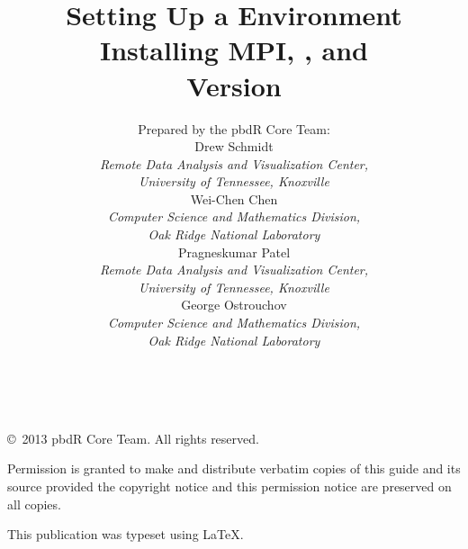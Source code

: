 \documentclass[a4paper,11pt]{article}
\title{\Huge Setting Up a \proglang{pbdR} Environment\\[.3cm] 
  {\LARGE Installing MPI, \proglang{R}, and \proglang{pbdR}\\[.4cm]Version \printversion}}
\author{
\begin{minipage}{\textwidth}
\centering
%
\vspace{1cm}Prepared by the pbdR Core Team:\\[.8cm]
%
Drew Schmidt\\
{\small\emph{Remote Data Analysis and Visualization Center,\\
University of Tennessee, Knoxville}}\\[.4cm]
Wei-Chen Chen\\
{\small\emph{Computer Science and Mathematics Division, \\
Oak Ridge National Laboratory}}\\[.4cm]
Pragneskumar Patel\\
{\small\emph{Remote Data Analysis and Visualization Center,\\
University of Tennessee, Knoxville}}\\[.4cm]
%
George Ostrouchov\\
{\small\emph{Computer Science and Mathematics Division, \\
Oak Ridge National Laboratory}}
\end{minipage}
}
\begin{document}
\prebodyheadfoot



\date{}
\maketitle

\ \vfill

\copyright\ 2013 pbdR Core Team.  All rights reserved.

Permission is granted to make and distribute verbatim copies of this guide and its source provided the copyright notice and this permission notice are preserved on all copies.

This publication was typeset using \LaTeX.  


\newpage
{}
\fancyhf[R]{\thepage }
\fancyfoot{}
\tableofcontents


\newpage
{}
\setcounter{page}{1}
\pagestyle{fancy}

\bodyheadfoot





% 
% 

\end{document}
